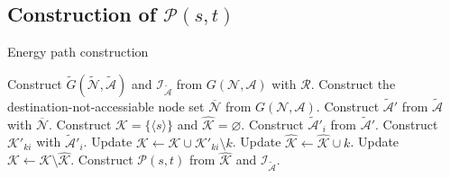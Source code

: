 \documentclass[journal]{IEEEtran}
\begin{document}
\subsection{Construction of $\mathcal{P}(s,t)$}  \label{sec:construction}

\begin{algorithm}
\caption{Energy path construction} \label{pathalgo}
\begin{algorithmic}[1]
\STATE Construct $\tilde{G}(\tilde{\mathcal{N}},\tilde{\mathcal{A}})$ and $\mathcal{I}_{\tilde{\mathcal{A}}}$ from $G(\mathcal{N},\mathcal{A})$ with $\mathcal{R}$.
\STATE Construct the destination-not-accessiable node set $\overline{\mathcal{N}}$ from $G(\mathcal{N},\mathcal{A})$.
\STATE Construct $\tilde{\mathcal{A}}'$ from $\tilde{\mathcal{A}}$ with $\overline{\mathcal{N}}$.
\STATE Construct $\mathcal{K}=\{\langle s \rangle\}$ and $\hat{\mathcal{K}}=\varnothing$.
\REPEAT
		\STATE Construct $\tilde{\mathcal{A}}'_i$ from $\tilde{\mathcal{A}}'$.
			\STATE Construct $\mathcal{K}'_{ki}$ with $\tilde{\mathcal{A}}'_i$.
			\STATE Update $\mathcal{K} \gets \mathcal{K}\cup \mathcal{K}'_{ki} \setminus k$.
		\ENDFOR
	\ENDFOR
		\STATE Update $\hat{\mathcal{K}} \gets \hat{\mathcal{K}}\cup k$.
	\ENDFOR
	\STATE Update $\mathcal{K} \gets \mathcal{K}\setminus \hat{\mathcal{K}}$.
\STATE Construct $\mathcal{P}(s,t)$ from $\hat{\mathcal{K}}$ and $\mathcal{I}_{\tilde{\mathcal{A}}}$.
\end{algorithmic}
\end{algorithm}
\end{document}
